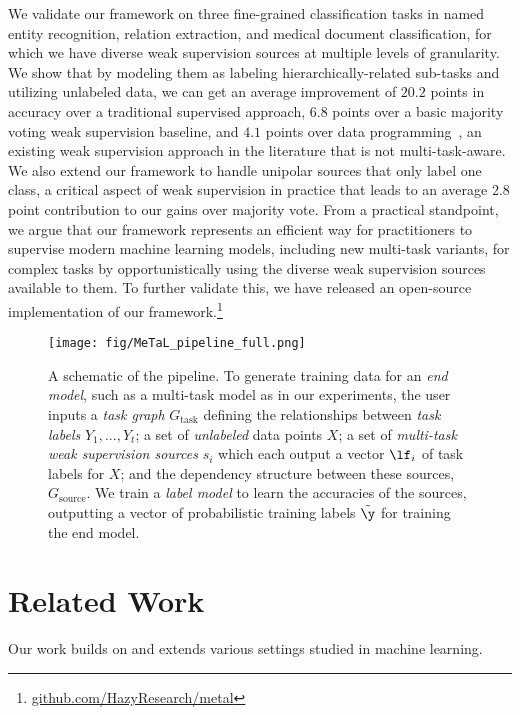 \documentclass[letterpaper]{article}
\newcommand{\AvgGainOverGold}[0]{20.2}
\newcommand{\AvgGainOverMV}[0]{6.8}
\newcommand{\AvgGainOverDP}[0]{4.1}
\newcommand{\AvgUnipolarBoost}[0]{2.8}
\begin{document}
We validate our framework on three fine-grained classification tasks in named entity recognition, relation extraction, and medical document classification, for which we have diverse weak supervision sources at multiple levels of granularity.
We show that by modeling them as labeling hierarchically-related sub-tasks and utilizing unlabeled data, we can get an average improvement of $\AvgGainOverGold$ points in accuracy over a traditional supervised approach, $\AvgGainOverMV$ points over a basic majority voting weak supervision baseline, and $\AvgGainOverDP$ points over data programming~\cite{ratner2016data}, an existing weak supervision approach in the literature that is not multi-task-aware.
We also extend our framework to handle unipolar sources that only label one class, a critical aspect of weak supervision in practice that leads to an average $\AvgUnipolarBoost$ point contribution to our gains over majority vote.
From a practical standpoint, we argue that our framework represents an efficient way for practitioners to supervise modern machine learning models, including new multi-task variants, for complex tasks by opportunistically using the diverse weak supervision sources available to them.
To further validate this, we have released an open-source implementation of our framework.\footnote{\url{github.com/HazyResearch/metal}}

\begin{figure*}
	\centering
	\texttt{[image: fig/MeTaL\_pipeline\_full.png]}
	\caption{
		A schematic of the \systemx pipeline.
		To generate training data for an \textit{end model}, such as a multi-task model as in our experiments, the user inputs a \textit{task graph} $G_{\text{task}}$ defining the relationships between \textit{task labels} $Y_1,...,Y_t$; a set of \textit{unlabeled} data points $X$; a set of \textit{multi-task weak supervision sources} $s_i$ which each output a vector $\lf_i$ of task labels for $X$; and the dependency structure between these sources, $G_{\text{source}}$.
		We train a \textit{label model} to learn the accuracies of the sources, outputting a vector of probabilistic training labels $\tilde{\y}$ for training the end model.
	}
	\label{fig:ws_pipeline}
\end{figure*} 
\section{Related Work}
\label{sec:related_work}


Our work builds on and extends various settings studied in machine learning.
\end{document}
